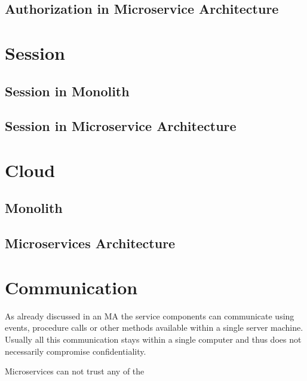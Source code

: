 \subsection{Authorization in Microservice Architecture}




\section{Session}
\subsection{Session in Monolith}
\subsection{Session in Microservice Architecture}




\section{Cloud}
\subsection{Monolith}
\subsection{Microservices Architecture}




\section{Communication}
\begin{sloppypar}
    As already discussed in an MA the service components can communicate using 
    events, procedure calls or other methods available within a single server 
    machine. Usually all this communication stays within a single computer and 
    thus does not necessarily compromise confidentiality.
\end{sloppypar}
\begin{sloppypar}
    Microservices can not trust any of the \citep{otterstad}
\end{sloppypar}


